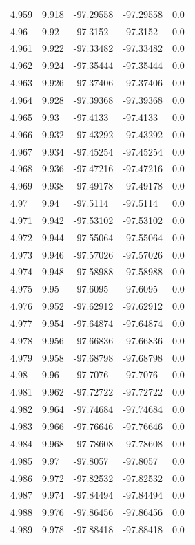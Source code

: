 \begin{tabular}{lllll}
4.959 & 9.918 & -97.29558 & -97.29558 & 0.0 \\
4.96 & 9.92 & -97.3152 & -97.3152 & 0.0 \\
4.961 & 9.922 & -97.33482 & -97.33482 & 0.0 \\
4.962 & 9.924 & -97.35444 & -97.35444 & 0.0 \\
4.963 & 9.926 & -97.37406 & -97.37406 & 0.0 \\
4.964 & 9.928 & -97.39368 & -97.39368 & 0.0 \\
4.965 & 9.93 & -97.4133 & -97.4133 & 0.0 \\
4.966 & 9.932 & -97.43292 & -97.43292 & 0.0 \\
4.967 & 9.934 & -97.45254 & -97.45254 & 0.0 \\
4.968 & 9.936 & -97.47216 & -97.47216 & 0.0 \\
4.969 & 9.938 & -97.49178 & -97.49178 & 0.0 \\
4.97 & 9.94 & -97.5114 & -97.5114 & 0.0 \\
4.971 & 9.942 & -97.53102 & -97.53102 & 0.0 \\
4.972 & 9.944 & -97.55064 & -97.55064 & 0.0 \\
4.973 & 9.946 & -97.57026 & -97.57026 & 0.0 \\
4.974 & 9.948 & -97.58988 & -97.58988 & 0.0 \\
4.975 & 9.95 & -97.6095 & -97.6095 & 0.0 \\
4.976 & 9.952 & -97.62912 & -97.62912 & 0.0 \\
4.977 & 9.954 & -97.64874 & -97.64874 & 0.0 \\
4.978 & 9.956 & -97.66836 & -97.66836 & 0.0 \\
4.979 & 9.958 & -97.68798 & -97.68798 & 0.0 \\
4.98 & 9.96 & -97.7076 & -97.7076 & 0.0 \\
4.981 & 9.962 & -97.72722 & -97.72722 & 0.0 \\
4.982 & 9.964 & -97.74684 & -97.74684 & 0.0 \\
4.983 & 9.966 & -97.76646 & -97.76646 & 0.0 \\
4.984 & 9.968 & -97.78608 & -97.78608 & 0.0 \\
4.985 & 9.97 & -97.8057 & -97.8057 & 0.0 \\
4.986 & 9.972 & -97.82532 & -97.82532 & 0.0 \\
4.987 & 9.974 & -97.84494 & -97.84494 & 0.0 \\
4.988 & 9.976 & -97.86456 & -97.86456 & 0.0 \\
4.989 & 9.978 & -97.88418 & -97.88418 & 0.0 \\

\end{tabular}
